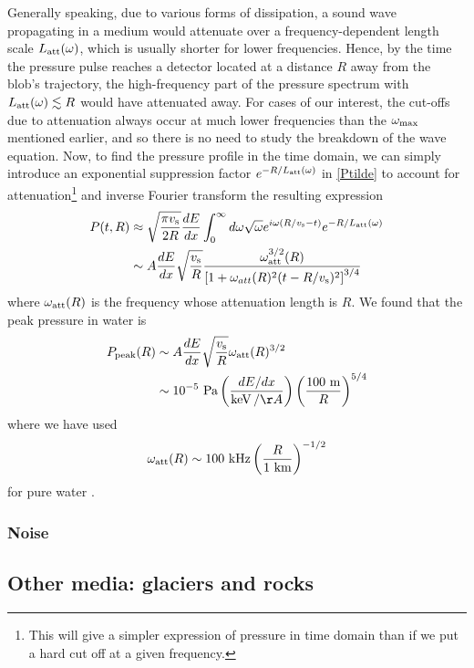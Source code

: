 \documentclass[%
 reprint,
 amsmath,amssymb,
 aps,nofootinbib
]{revtex4-1}
\newcommand{\keV}{\mathinner{\mathrm{keV}}}
\begin{document}
Generally speaking, due to various forms of dissipation, a sound wave propagating in a medium would attenuate over a frequency-dependent length scale $L_{\rm att}(\omega)$, which is usually shorter for lower frequencies. Hence, by the time the pressure pulse reaches a detector located at a distance $R$ away from the blob's trajectory, the high-frequency part of the pressure spectrum with $L_{\rm att}(\omega)\lesssim R$ would have attenuated away. For cases of our interest, the cut-offs due to attenuation always occur at much lower frequencies than the $\omega_{\rm max}$ mentioned earlier, and so there is no need to study the breakdown of the wave equation. Now, to find the pressure profile in the time domain, we can simply introduce an exponential suppression factor $e^{-R/L_{\rm att}(\omega)}$ in \eqref{Ptilde} to account for attenuation\footnote{This will give a simpler expression of pressure in time domain than if we put a hard cut off at a given frequency.} and inverse Fourier transform the resulting expression
\begin{align}
    P(t,R)&\approx \sqrt{\frac{\pi v_{\rm s}}{2R}}\frac{dE}{dx}\int_0^{\infty} d\omega\sqrt{\omega} e^{i\omega (R/v_{\rm s}-t)}e^{-R/L_{\rm att}(\omega)}\nonumber\\
    &\sim A\frac{dE}{dx}\sqrt{\frac{v_{\rm s}}{R}}\frac{\omega_{\rm att}^{3/2}(R)}{\left[1+\omega_{att}(R)^2(t-R/v_{\rm s})^2\right]^{3/4}}
\end{align}
where $\omega_{\rm att}(R)$ is the frequency whose attenuation length is $R$. We found that the peak pressure in water is
\begin{align}
    P_{\rm peak}(R)&\sim A\frac{dE}{dx}\sqrt{\frac{v_{\rm s}}{R}}\omega_{\rm att}(R)^{3/2}\nonumber\\
    &\sim 10^{-5}\text{ Pa} \left(\frac{dE/dx}{\keV/\AA}\right)\left(\frac{100\text{ m}}{R}\right)^{5/4}
\end{align}
where we have used 
\begin{equation}
    \omega_{\rm att}(R)\sim 100 \text{ kHz} \left(\frac{R}{1\text{ km}}\right)^{-1/2}
\end{equation}
for pure water \cite{Lahmann:2017hsh}.




\subsubsection{Noise}



\subsection{Other media: glaciers and rocks}
\end{document}
